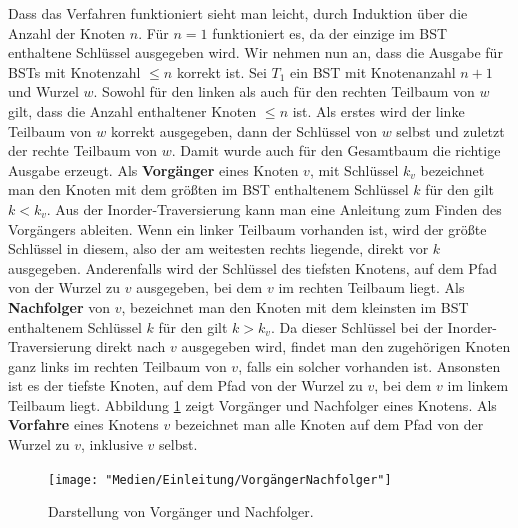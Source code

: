 \documentclass[a4paper,12pt]{article}
\begin{document}
\noindent Dass das Verfahren funktioniert sieht man leicht, durch Induktion über die Anzahl der Knoten $n$.
Für $n = 1$ funktioniert es, da der einzige im BST enthaltene Schlüssel ausgegeben wird. Wir nehmen nun an, dass die Ausgabe für BSTs mit Knotenzahl $\leq n$ korrekt ist. Sei $T_1$ ein BST mit Knotenanzahl $n + 1$ und Wurzel $w$. Sowohl für den linken als auch für den rechten Teilbaum von $w$ gilt, dass die Anzahl enthaltener Knoten $\leq n$ ist. Als erstes wird der linke Teilbaum von $w$ korrekt ausgegeben, dann der Schlüssel von $w$ selbst und zuletzt der rechte Teilbaum von $w$. Damit wurde auch für den Gesamtbaum die richtige
Ausgabe erzeugt. 
Als \textbf{Vorgänger} eines Knoten $v$, mit Schlüssel $k_v$ bezeichnet man den Knoten mit dem größten im BST enthaltenem Schlüssel $k$ für den gilt $k < k_v$. Aus der Inorder-Traversierung kann man eine Anleitung zum Finden des Vorgängers ableiten. Wenn ein linker Teilbaum vorhanden ist, wird der größte Schlüssel in diesem, also der am weitesten rechts liegende, direkt vor $k$ ausgegeben. Anderenfalls wird der Schlüssel des tiefsten Knotens, auf dem Pfad von der Wurzel zu $v$ ausgegeben, bei dem $v$ im rechten Teilbaum liegt. Als \textbf{Nachfolger} von $v$, bezeichnet man den Knoten mit dem kleinsten im BST enthaltenem Schlüssel $k$ für den gilt $k > k_v$.
Da dieser Schlüssel bei der Inorder-Traversierung direkt nach $v$ ausgegeben wird, findet man den zugehörigen Knoten ganz links im rechten Teilbaum von $v$, falls ein solcher vorhanden ist. Ansonsten ist es der tiefste Knoten, auf dem Pfad von der Wurzel zu $v$, bei dem $v$ im linkem Teilbaum liegt. Abbildung \ref{fig:VorgängerNachfolger} zeigt Vorgänger und Nachfolger eines Knotens. Als \textbf{Vorfahre} eines Knotens $v$ bezeichnet man alle Knoten auf dem Pfad von der Wurzel zu $v$, inklusive $v$ selbst. 

\begin{figure}[h]
	\centering
	\texttt{[image: "Medien/Einleitung/VorgängerNachfolger"]}
	\caption{Darstellung von Vorgänger und Nachfolger. }
	\label{fig:VorgängerNachfolger}
\end{figure}
\end{document}
